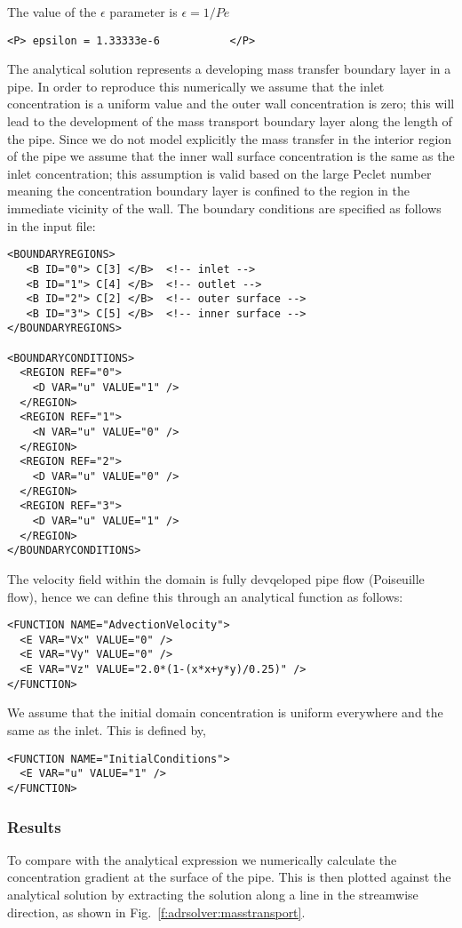 The value of the $\epsilon$ parameter is $\epsilon = 1/Pe$
\begin{lstlisting}[style=XMLStyle]
<P> epsilon = 1.33333e-6           </P>
\end{lstlisting}

The analytical solution represents a developing mass transfer boundary layer in
a pipe. In order to reproduce this numerically we assume that the inlet
concentration is a uniform value and the outer wall concentration is zero; this
will lead to the development of the mass transport boundary layer along the
length of the pipe. Since we do not model explicitly the mass transfer in the
interior region of the pipe we assume that the inner wall surface concentration
is the same as the inlet concentration; this assumption is valid based on the
large Peclet number meaning the concentration boundary layer is confined to the
region in the immediate vicinity of the wall. The boundary conditions are
specified as follows in the input file:
\begin{lstlisting}[style=XMLStyle]
<BOUNDARYREGIONS>
   <B ID="0"> C[3] </B>  <!-- inlet -->
   <B ID="1"> C[4] </B>  <!-- outlet -->
   <B ID="2"> C[2] </B>  <!-- outer surface -->
   <B ID="3"> C[5] </B>  <!-- inner surface -->
</BOUNDARYREGIONS>

<BOUNDARYCONDITIONS>
  <REGION REF="0">
    <D VAR="u" VALUE="1" />
  </REGION>
  <REGION REF="1">
    <N VAR="u" VALUE="0" />
  </REGION>
  <REGION REF="2">
    <D VAR="u" VALUE="0" />
  </REGION>
  <REGION REF="3">
    <D VAR="u" VALUE="1" />
  </REGION>
</BOUNDARYCONDITIONS>
\end{lstlisting}

The velocity field within the domain is fully devqeloped pipe flow (Poiseuille
flow), hence we can define this through an analytical function as follows:
\begin{lstlisting}[style=XMLStyle]
<FUNCTION NAME="AdvectionVelocity">
  <E VAR="Vx" VALUE="0" />
  <E VAR="Vy" VALUE="0" />
  <E VAR="Vz" VALUE="2.0*(1-(x*x+y*y)/0.25)" />
</FUNCTION>
\end{lstlisting}

We assume that the initial domain concentration is uniform everywhere and the
same as the inlet. This is defined by,
\begin{lstlisting}[style=XMLStyle]
<FUNCTION NAME="InitialConditions">
  <E VAR="u" VALUE="1" />
</FUNCTION>
\end{lstlisting}

\subsubsection{Results}
To compare with the analytical expression we numerically calculate the
concentration gradient at the surface of the pipe. This is then plotted against
the analytical solution by extracting the solution along a line in the
streamwise direction, as shown in Fig.~\ref{f:adrsolver:masstransport}.

